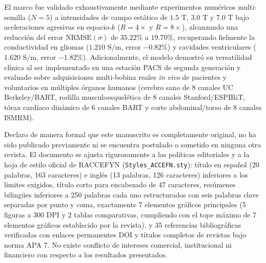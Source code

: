 \documentclass[11pt,a4paper]{article}
\begin{document}
El marco fue validado exhaustivamente mediante experimentos numéricos multi-semilla ($N=5$) a intensidades de campo estático de $1.5\text{ T}$, $3.0\text{ T}$ y $7.0\text{ T}$ bajo aceleraciones agresivas en espacio-$k$ ($R=4\times$ y $R=8\times$), alcanzando una reducción del error $\text{NRMSE}(\sigma)$ de $35.22\%$ a $19.70\%$, recuperando fielmente la conductividad en gliomas ($1.210\text{ S/m}$, error $-0.82\%$) y cavidades ventriculares ($1.620\text{ S/m}$, error $-1.82\%$). Adicionalmente, el modelo demostró su versatilidad clínica al ser implementado en una estación PACS de segunda generación y evaluado sobre adquisiciones multi-bobina reales \textit{in vivo} de pacientes y voluntarios en múltiples órganos humanos (cerebro sano de 8 canales UC Berkeley/BART, rodilla musculoesquelética de 8 canales Stanford/ESPIRiT, tórax cardíaco dinámico de 6 canales BART y corte abdominal/torso de 8 canales ISMRM).

Declaro de manera formal que este manuscrito es completamente original, no ha sido publicado previamente ni se encuentra postulado o sometido en ninguna otra revista. El documento se ajusta rigurosamente a las políticas editoriales y a la hoja de estilo oficial de RACCEFYN (\texttt{Styles\_ACCEFN.sty}): título en español (20 palabras, 163 caracteres) e inglés (13 palabras, 126 caracteres) inferiores a los límites exigidos, título corto para encabezado de 47 caracteres, resúmenes bilingües inferiores a 250 palabras cada uno estructurados con seis palabras clave separadas por punto y coma, exactamente 7 elementos gráficos principales (5 figuras a 300 DPI y 2 tablas comparativas, cumpliendo con el tope máximo de 7 elementos gráficos establecido por la revista), y 35 referencias bibliográficas verificadas con enlaces permanentes DOI y títulos completos de revistas bajo norma APA 7. No existe conflicto de intereses comercial, institucional ni financiero con respecto a los resultados presentados.

\vspace{0.4cm}
\end{document}
